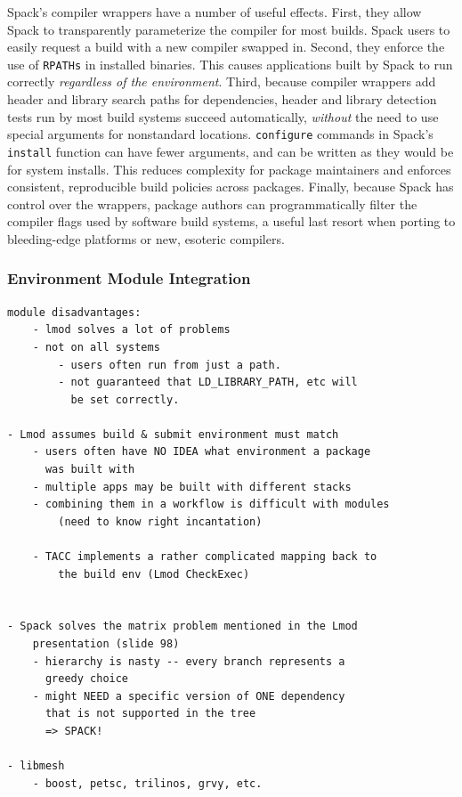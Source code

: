 Spack's compiler wrappers have a number of useful effects.  First, they allow
Spack to transparently parameterize the compiler for most builds. 
Spack users to easily request a build with a new compiler swapped in.
Second, they enforce the use of {\tt RPATHs} in
installed binaries.  This causes applications built by Spack to run correctly
{\it regardless of the environment}.  Third, because compiler wrappers add 
header and library search paths for dependencies, header and library detection
tests run by most build systems succeed automatically, {\it without}
the need to use special arguments for nonstandard locations.  {\tt configure}
commands in Spack's {\tt install} function can have fewer arguments, and can
be written as they would be for system installs.  This reduces complexity
for package maintainers and enforces consistent, reproducible
build policies across packages.  Finally, because Spack has control over the 
wrappers, package authors can programmatically filter the compiler flags
used by software build systems, a useful last resort when porting to
bleeding-edge platforms or new, esoteric compilers.

\subsubsection{Environment Module Integration}









\begin{verbatim}
module disadvantages:
	- lmod solves a lot of problems
	- not on all systems
		- users often run from just a path.
		- not guaranteed that LD_LIBRARY_PATH, etc will
		  be set correctly.

- Lmod assumes build & submit environment must match
	- users often have NO IDEA what environment a package
	  was built with
	- multiple apps may be built with different stacks
	- combining them in a workflow is difficult with modules
		(need to know right incantation)

	- TACC implements a rather complicated mapping back to
	    the build env (Lmod CheckExec)
	

- Spack solves the matrix problem mentioned in the Lmod
    presentation (slide 98)
	- hierarchy is nasty -- every branch represents a
	  greedy choice
	- might NEED a specific version of ONE dependency
	  that is not supported in the tree
	  => SPACK!

- libmesh
	- boost, petsc, trilinos, grvy, etc.
\end{verbatim}










